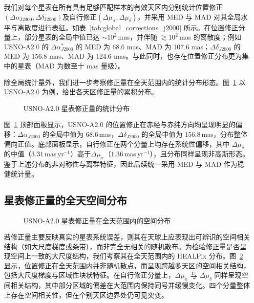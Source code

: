 \documentclass{aastex701}
\begin{document}
我们对每个星表在所有具有足够匹配样本的有效天区内分别统计位置修正$(\Delta \alpha_{\mathrm{J2000}}, \Delta \delta_{\mathrm{J2000}})$及自行修正$(\Delta \mu_{\alpha}, \Delta \mu_{\delta})$，并采用 MED 与 MAD 对其全局水平与离散度进行表征。如表~\ref{tab:global_corrections_j2000} 所示。在位置修正分量上，部分星表的全局中值已达 $\sim10^2$\,mas，并伴随 $\gtrsim10^2$\,mas 的离散度；例如 USNO-A2.0 的 $\Delta\alpha^\ast_{J2000}$ 的 MED 为 68.6 mas、MAD 为 107.6 mas；$\Delta\delta_{J2000}$ 的 MED 为 156.8 mas、MAD 为 124.6 mas。与此同时，也存在位置修正分布更为集中的星表（MAD 为数至十 mas 量级）。

除全局统计量外，我们进一步考察修正量在全天范围内的统计分布形态。图~\ref{fig:hist_usnoa2} 以 USNO-A2.0 为例，给出各天区修正量的累积分布。

\begin{figure}[ht!]
\caption{USNO-A2.0 星表修正量的统计分布}
\label{fig:hist_usnoa2}
\end{figure}

图~\ref{fig:hist_usnoa2} 顶部面板显示，USNO-A2.0 的位置修正在赤经与赤纬方向均呈现明显的偏移：$\Delta\alpha_{J2000}$ 的全局中值为 $68.6$\,mas，$\Delta\delta_{J2000}$ 的全局中值为 $156.8$\,mas，分布整体偏向正值。底部面板显示，自行修正在两个分量上均存在系统性偏移，其中 $\Delta\mu_{\delta}$ 的中值（$3.31$\,mas\,yr$^{-1}$）高于$\Delta\mu_{\alpha}$（$1.36$\,mas\,yr$^{-1}$），且分布同样呈现非高斯形态。鉴于上述分布的非对称性与离群特征，因此后续统一采用 MED 与 MAD 作为稳健统计量。

\subsection{星表修正量的全天空间分布} \label{subsec:bias_usnoa2_2x2}

\begin{figure}[ht!]
\caption{USNO-A2.0 星表修正量在全天范围内的空间分布}
\label{fig:bias_usno_a2_2x2}
\end{figure}

若修正量主要反映真实的星表系统误差，则其在天球上应表现出可辨识的空间相关结构（如大尺度梯度或条带），而非完全无相关的随机散布。为检验修正量是否呈现空间上一致的大尺度结构，我们考察其在全天范围内的 HEALPix 分布。图~\ref{fig:bias_usno_a2_2x2} 显示，位置修正在全天范围内并非随机散点，而呈现跨越多天区的空间相关结构，包括大尺度梯度与区域性块状特征。在自行修正分量上，$\Delta\mu_{\alpha}$ 与 $\Delta\mu_{\delta}$ 同样呈现空间相关结构，其中部分区域的偏差在大范围内保持同号并缓慢变化。四个分量整体上存在空间相关性，但在个别天区边界处仍可见突变。
\end{document}

